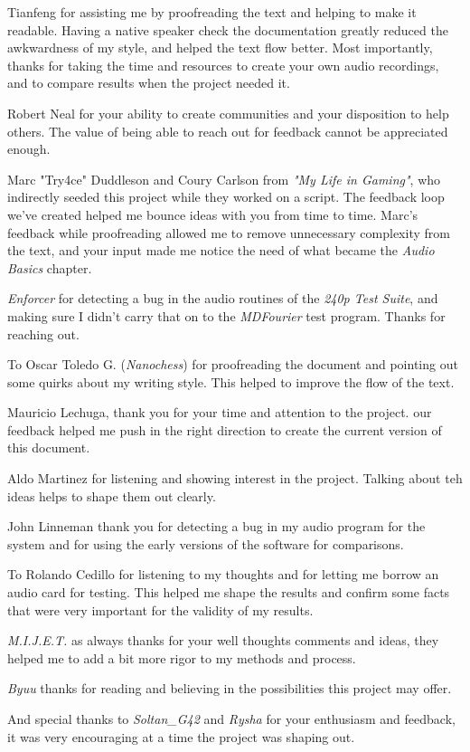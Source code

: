 \documentclass[10pt,a4paper]{report}
\begin{document}
\begin{appendices}
Tianfeng for assisting me by proofreading the text and helping to make it readable. Having a native speaker check the documentation greatly reduced the awkwardness of my style, and helped the text flow better. Most importantly, thanks for taking the time and resources to create your own audio recordings, and to compare results when the project needed it.

Robert Neal for your ability to create communities and your disposition to help others. The value of being able to reach out for feedback cannot be appreciated enough.

Marc "Try4ce" Duddleson and Coury Carlson from \textit{"My Life in Gaming"}, who indirectly seeded this project while they worked on a script. The feedback loop we've created helped me bounce ideas with you from time to time. Marc's feedback while proofreading allowed me to remove unnecessary complexity from the text, and your input made me notice the need of what became the \textit{Audio Basics} chapter.

\textit{Enforcer} for detecting a bug in the audio routines of the \textit{240p Test Suite}, and making sure I didn't carry that on to the \textit{MDFourier} test program. Thanks for reaching out.

To  Oscar Toledo G. (\textit{Nanochess}) for proofreading the document and pointing out some quirks about my writing style. This helped to improve the flow of the text.

Mauricio Lechuga, thank you for your time and attention to the project. our feedback helped me push in the right direction to create the current version of this document. 

Aldo Martinez for listening and showing interest in the project. Talking about teh ideas helps to shape them out clearly.

John Linneman thank you for detecting a bug in my audio program for the system and for using the early versions of the software for comparisons.

To Rolando Cedillo for listening to my thoughts and for letting me borrow an audio card for testing. This helped me shape the results and confirm some facts that were very important for the validity of my results.

\textit{M.I.J.E.T.} as always thanks for your well thoughts comments and ideas, they helped me to add a bit more rigor to my methods and process.

\textit{Byuu} thanks for reading and believing in the possibilities this project may offer.

And special thanks to \textit{Soltan\_G42} and \textit{Rysha} for your enthusiasm and feedback, it was very encouraging at a time the project was shaping out.

\end{appendices}
\end{document}
